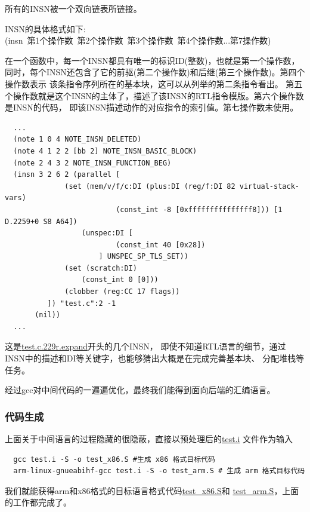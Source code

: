\documentclass[UTF8,a4paper,10pt]{ctexart}
\begin{document}
所有的INSN被一个双向链表所链接。
\par
INSN的具体格式如下:
\\
(insn\ 第1个操作数\ 第2个操作数\  第3个操作数\ 第4个操作数...第7操作数)
\par
在一个函数中，每一个INSN都具有唯一的标识ID(整数)，也就是第一个操作数，
同时，每个INSN还包含了它的前驱(第二个操作数)和后继(第三个操作数)。第四个操作数表示
该条指令序列所在的基本块，这可以从列举的第二条指令看出。
第五个操作数就是这个INSN的主体了，描述了该INSN的RTL指令模版。第六个操作数是INSN的代码，
即该INSN描述动作的对应指令的索引值。第七操作数未使用。
\begin{lstlisting}
  ...
  (note 1 0 4 NOTE_INSN_DELETED)
  (note 4 1 2 2 [bb 2] NOTE_INSN_BASIC_BLOCK)
  (note 2 4 3 2 NOTE_INSN_FUNCTION_BEG)
  (insn 3 2 6 2 (parallel [
              (set (mem/v/f/c:DI (plus:DI (reg/f:DI 82 virtual-stack-vars)
                          (const_int -8 [0xfffffffffffffff8])) [1 D.2259+0 S8 A64])
                  (unspec:DI [
                          (const_int 40 [0x28])
                      ] UNSPEC_SP_TLS_SET))
              (set (scratch:DI)
                  (const_int 0 [0]))
              (clobber (reg:CC 17 flags))
          ]) "test.c":2 -1
       (nil))
  ...
  \end{lstlisting}
这是\href{run:./test/rtl/test.c.229r.expand}{test.c.229r.expand}开头的几个INSN，
即使不知道RTL语言的细节，通过INSN中的描述和DI等关键字，也能够猜出大概是在完成完善基本块、
分配堆栈等任务。
\par
经过gcc对中间代码的一遍遍优化，最终我们能得到面向后端的汇编语言。

\subsubsection{代码生成}
上面关于中间语言的过程隐藏的很隐蔽，直接以预处理后的\href{run:./test/test.i}{test.i}
文件作为输入
\begin{lstlisting}
  gcc test.i -S -o test_x86.S #生成 x86 格式目标代码
  arm-linux-gnueabihf-gcc test.i -S -o test_arm.S # 生成 arm 格式目标代码
\end{lstlisting}
我们就能获得arm和x86格式的目标语言格式代码\href{run:./test/test\_x86.S}{test\_x86.S}和
\href{run:./test/test\_arm.S}{test\_arm.S}，上面的工作都完成了。
\end{document}
